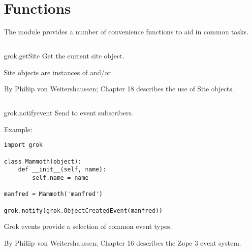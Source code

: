 \chapter{Functions}

The  module provides a number of convenience functions to aid in
common tasks.

  \section{}

    \begin{funcdesc}{grok.getSite}{}
    Get the current site object.

      \begin{seealso}
      Site objects are instances of  and/or
      .
      \end{seealso}

      \begin{seealso}
      {By Philiip von Weitershaussen; Chapter 18 describes the use of Site
      objects.}
      \end{seealso}

    \end{funcdesc}

  \section{}

    \begin{funcdesc}{grok.notify}{event}
    Send  to event subscribers.

    Example:
\begin{verbatim}
import grok

class Mammoth(object):
    def __init__(self, name):
        self.name = name

manfred = Mammoth('manfred')

grok.notify(grok.ObjectCreatedEvent(manfred))
\end{verbatim}

      \begin{seealso}
      Grok events provide a selection of common event types.
      \end{seealso}

      \begin{seealso}
      {By Philiip von Weitershaussen; Chapter 16 describes the Zope 3 event
      system.}
      \end{seealso}

    \end{funcdesc}

